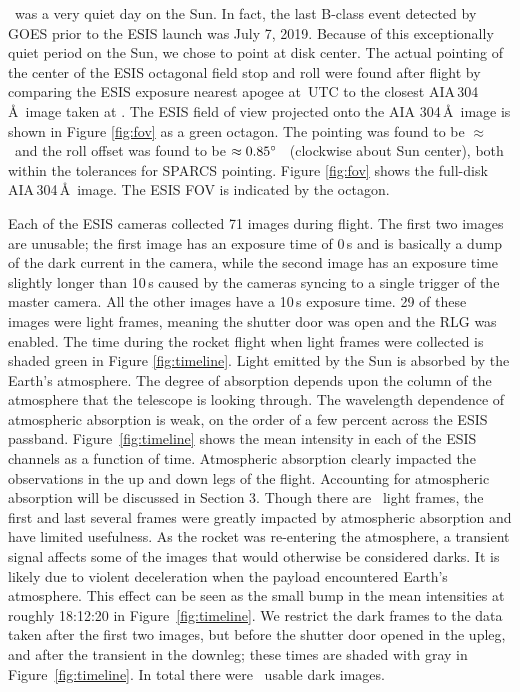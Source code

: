 	    \dateMission\ was a very quiet day on the Sun.  
	    In fact, the last  B-class event detected by GOES \citep{GOES} prior to the ESIS launch was July 7, 2019.  Because of this exceptionally quiet period on the Sun, we chose to point at disk center. 
	    The actual pointing of the center of the ESIS octagonal field stop and roll were found after flight by comparing the ESIS exposure nearest apogee at \timeApogeeFrame\,UTC to the closest AIA\,304\,\AA\ image taken at \aianearapogee.  
	    The ESIS field of view projected onto the AIA 304\,\AA\ image is shown in Figure \ref{fig:fov} as a green octagon.  
	    The pointing was found to be $\approx$ \esispointing \ and the roll offset was found to be $\approx 0.85^{\circ}$ \ (clockwise about Sun center), both within the tolerances for SPARCS pointing.  
	    Figure \ref{fig:fov} shows the full-disk AIA\,304\,\AA\ image. 
	    The ESIS FOV is indicated by the octagon.  
	    
		Each of the ESIS cameras collected 71 images during flight.  
		The first two images are unusable; the first image has an exposure time of 0\,s and is basically a dump of the dark current in the camera, while the second image has an exposure time slightly longer than 10\,s caused by the cameras syncing to a single trigger of the master camera.  
		All the other images have a 10\,s exposure time. 
		29 of these images were light frames, meaning the shutter door was open and the RLG was enabled. 
		The time during the rocket flight when light frames were collected is shaded green in Figure \ref{fig:timeline}.  
		Light emitted by the Sun is absorbed by the Earth's atmosphere.  
		The degree of absorption depends upon the column of the atmosphere that the telescope is looking through. The wavelength dependence of atmospheric absorption is weak, on the order of a few percent across the ESIS passband.  
		Figure~\ref{fig:timeline} shows the mean intensity in each of the ESIS channels as a function of time.  Atmospheric absorption clearly impacted the observations in the up and down legs of the flight.  
		Accounting for atmospheric absorption will be discussed in Section 3.  
		Though there are \numDataFrames\ light frames, the first and last several frames were greatly impacted by atmospheric absorption and have limited usefulness.  As the rocket was re-entering the atmosphere, a transient signal affects some of the images that would otherwise be considered darks.  It is likely due to violent deceleration when the payload encountered Earth's atmosphere.
		This effect can be seen as the small bump in the mean intensities at roughly 18:12:20 in Figure~\ref{fig:timeline}.  
		We restrict the dark frames to the data taken after the first two images, but before the shutter door opened in the upleg, and after the transient in the downleg; these times are shaded with gray in Figure~\ref{fig:timeline}.  
		In total there were \numDarkFrames\ usable dark images.  
		
